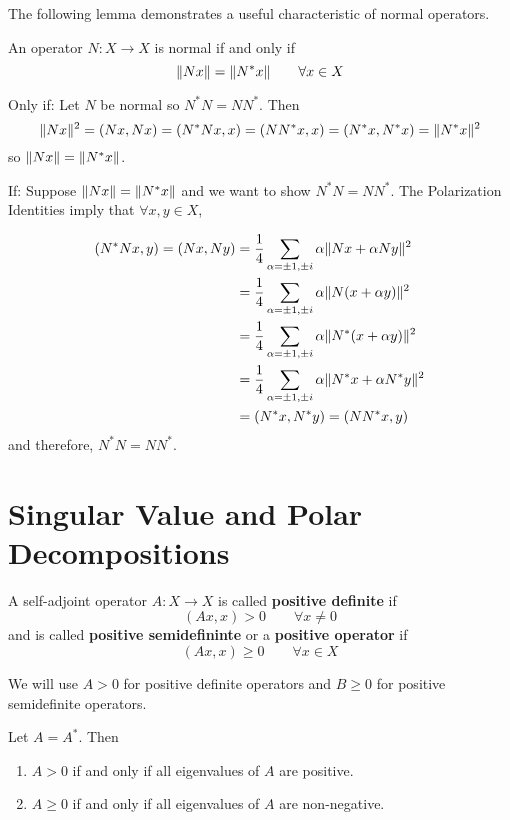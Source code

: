 The following lemma demonstrates a useful characteristic of normal operators. 

\begin{lemma}
An operator $N: X \rightarrow X$ is normal if and only if 
$$\lVert Nx\rVert = \lVert N^{*} x\rVert \qquad \forall x \in X$$
\end{lemma}

\begin{lproof}
Only if: Let $N$ be normal so $N^{*}N = NN^{*}$. Then 
$$\lVert Nx\rVert^{2} = (Nx, Nx) = (N^{*}Nx, x) = (NN^{*} x, x) = (N^{*} x, N^{*} x) = \lVert N^{*} x\rVert^{2} $$
so $\lVert Nx\rVert = \lVert N^{*} x\rVert$.

If: Suppose $\lVert Nx\rVert = \lVert N^{*} x\rVert$ and we want to show $N^{*}N = NN^{*}$. The Polarization Identities imply that $ \forall x, y \in X$, 

$$
\begin{aligned} 
(N^{*}N x, y) = (Nx, Ny) &= \frac{1}{4} \sum_{\alpha = \pm 1, \pm i} \alpha \lVert Nx + \alpha Ny\rVert^{2} \\
&= \frac{1}{4} \sum_{\alpha = \pm 1, \pm i} \alpha \lVert N( x + \alpha y)\rVert^{2} \\
&= \frac{1}{4} \sum_{\alpha = \pm 1, \pm i} \alpha \lVert N^{*} ( x + \alpha y)\rVert^{2} \\
&= \frac{1}{4} \sum_{\alpha = \pm 1, \pm i} \alpha \lVert N^{*} x + \alpha N^{*} y\rVert^{2} \\
&= (N^{*} x, N^{*} y) = (NN^{*} x, y)
\end{aligned} 
$$
and therefore, $N^{*}N = NN^{*}$. 
\end{lproof}

\section{Singular Value and Polar Decompositions}

\begin{definition}
A self-adjoint operator $A: X \rightarrow X$ is called \textbf{positive definite} if 
$$(Ax, x) > 0 \qquad \forall x \neq 0$$
and is called \textbf{positive semidefininte} or a \textbf{positive operator} if 
$$(Ax, x) \geq 0 \qquad \forall x \in X$$

We will use $A > 0$ for positive definite operators and $B \geq 0$ for positive semidefinite operators. 
\end{definition}

\begin{theorem}
Let $A = A^{*}$. Then 
\begin{enumerate}
	\item $A > 0$ if and only if all eigenvalues of $A$ are positive. 
	\item $A \geq 0$ if and only if all eigenvalues of $A$ are non-negative. 
\end{enumerate}
\end{theorem}

